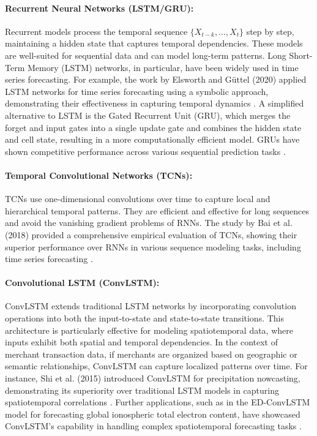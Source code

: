 \documentclass{article}
\begin{document}
\paragraph{Recurrent Neural Networks (LSTM/GRU):} Recurrent models process the temporal sequence \( \{X_{t-k}, \dots, X_t\} \) step by step, maintaining a hidden state that captures temporal dependencies. These models are well-suited for sequential data and can model long-term patterns. Long Short-Term Memory (LSTM) networks, in particular, have been widely used in time series forecasting. For example, the work by Elsworth and Güttel (2020) applied LSTM networks for time series forecasting using a symbolic approach, demonstrating their effectiveness in capturing temporal dynamics \cite{elsworth2020time}. A simplified alternative to LSTM is the Gated Recurrent Unit (GRU), which merges the forget and input gates into a single update gate and combines the hidden state and cell state, resulting in a more computationally efficient model. GRUs have shown competitive performance across various sequential prediction tasks \cite{cho2014learning}.


\paragraph{Temporal Convolutional Networks (TCNs):} TCNs use one-dimensional convolutions over time to capture local and hierarchical temporal patterns. They are efficient and effective for long sequences and avoid the vanishing gradient problems of RNNs. The study by Bai et al. (2018) provided a comprehensive empirical evaluation of TCNs, showing their superior performance over RNNs in various sequence modeling tasks, including time series forecasting \cite{bai2018empirical}.



\paragraph{Convolutional LSTM (ConvLSTM):} ConvLSTM extends traditional LSTM networks by incorporating convolution operations into both the input-to-state and state-to-state transitions. This architecture is particularly effective for modeling spatiotemporal data, where inputs exhibit both spatial and temporal dependencies. In the context of merchant transaction data, if merchants are organized based on geographic or semantic relationships, ConvLSTM can capture localized patterns over time. For instance, Shi et al. (2015) introduced ConvLSTM for precipitation nowcasting, demonstrating its superiority over traditional LSTM models in capturing spatiotemporal correlations \cite{shi2015convolutional}. Further applications, such as in the ED-ConvLSTM model for forecasting global ionospheric total electron content, have showcased ConvLSTM's capability in handling complex spatiotemporal forecasting tasks \cite{xia2022edconv}.
\end{document}
